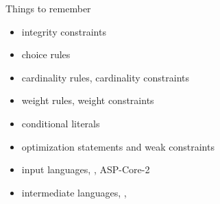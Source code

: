 \begin{frame}{Things to remember}
  \bigskip
  \begin{itemize}
  \item integrity constraints
  \item choice rules
  \item cardinality rules, cardinality constraints
  \item weight rules, weight constraints
    \medskip
  \item conditional literals
    \medskip
  \item optimization statements and weak constraints
    \medskip
  \item input languages, \gringo, ASP-Core-2
  \item intermediate languages, \smodels, \aspif\
  \end{itemize}
\end{frame}
%

